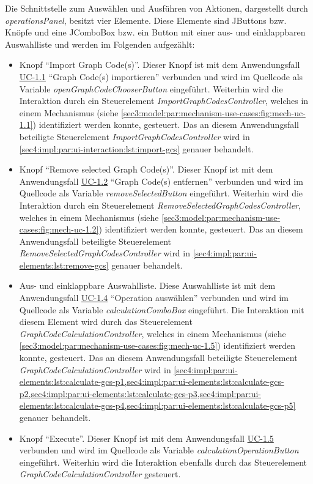 Die Schnittstelle zum Auswählen und Ausführen von Aktionen, dargestellt durch \textit{operationsPanel}, besitzt vier Elemente.
Diese Elemente sind JButtons bzw. Knöpfe und eine JComboBox bzw. ein Button mit einer aus- und einklappbaren Auswahlliste und werden im Folgenden aufgezählt:
\begin{itemize}
  \item Knopf \enquote{Import Graph Code(s)}.
  Dieser Knopf ist mit dem Anwendungsfall \hyperref[sec3:model:uc-1.1]{UC-1.1} \enquote{Graph Code(s) importieren} verbunden und wird im Quellcode als Variable \textit{openGraphCodeChooserButton} eingeführt.
  Weiterhin wird die Interaktion durch ein Steuerelement \textit{ImportGraphCodesController}, welches in einem Mechanismus (siehe \cref{sec3:model:par:mechanism-use-cases:fig:mech-uc-1.1}) identifiziert werden konnte, gesteuert.
  Das an diesem Anwendungsfall beteiligte Steuerelement \textit{ImportGraphCodesController} wird in \cref{sec4:impl:par:ui-interaction:lst:import-gcs} genauer behandelt.
  \item Knopf \enquote{Remove selected Graph Code(s)}.
  Dieser Knopf ist mit dem Anwendungsfall \hyperref[sec3:model:uc-1.2]{UC-1.2} \enquote{Graph Code(s) entfernen} verbunden und wird im Quellcode als Variable \textit{removeSelectedButton} eingeführt.
  Weiterhin wird die Interaktion durch ein Steuerelement \textit{RemoveSelectedGraphCodesController}, welches in einem Mechanismus (siehe \cref{sec3:model:par:mechanism-use-cases:fig:mech-uc-1.2}) identifiziert werden konnte, gesteuert.
  Das an diesem Anwendungsfall beteiligte Steuerelement \textit{RemoveSelectedGraphCodesController} wird in \cref{sec4:impl:par:ui-elements:lst:remove-gcs} genauer behandelt.
  \item Aus- und einklappbare Auswahlliste.
  Diese Auswahlliste ist mit dem Anwendungsfall \hyperref[sec3:model:uc-1.4]{UC-1.4} \enquote{Operation auswählen} verbunden und wird im Quellcode als Variable \textit{calculationComboBox} eingeführt.
  Die Interaktion mit diesem Element wird durch das Steuerelement \textit{GraphCodeCalculationController}, welches in einem Mechanismus (siehe \cref{sec3:model:par:mechanism-use-cases:fig:mech-uc-1.5}) identifiziert werden konnte, gesteuert.
  Das an diesem Anwendungsfall beteiligte Steuerelement \textit{GraphCodeCalculationController} wird in \cref{sec4:impl:par:ui-elements:lst:calculate-gcs-p1,sec4:impl:par:ui-elements:lst:calculate-gcs-p2,sec4:impl:par:ui-elements:lst:calculate-gcs-p3,sec4:impl:par:ui-elements:lst:calculate-gcs-p4,sec4:impl:par:ui-elements:lst:calculate-gcs-p5} genauer behandelt.
  \item Knopf \enquote{Execute}.
  Dieser Knopf ist mit dem Anwendungsfall \hyperref[sec3:model:uc-1.5]{UC-1.5} verbunden und wird im Quellcode als Variable \textit{calculationOperationButton} eingeführt.
  Weiterhin wird die Interaktion ebenfalls durch das Steuerelement \textit{GraphCodeCalculationController} gesteuert.
\end{itemize}
